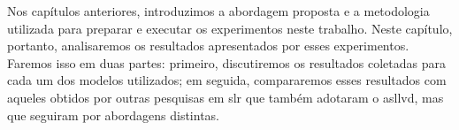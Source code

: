 Nos capítulos anteriores, introduzimos a abordagem proposta e a metodologia utilizada para preparar e executar os experimentos neste trabalho.
Neste capítulo, portanto, analisaremos os resultados apresentados por esses experimentos.
Faremos isso em duas partes: 
primeiro, discutiremos os resultados coletadas para cada um dos modelos utilizados; em seguida, compararemos esses resultados com aqueles obtidos por outras pesquisas em \acrfull{slr} que também adotaram o \acrfull{asllvd}, mas que seguiram por abordagens distintas.
